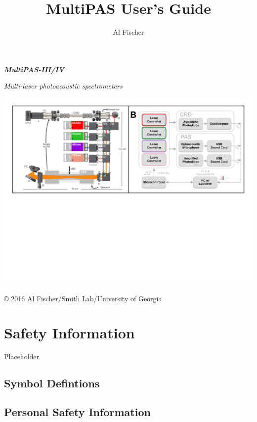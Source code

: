 \documentclass[]{book}
\title{MultiPAS User's Guide}
\author{Al Fischer}
\date{}
\begin{document}
\maketitle

\chapter*{}\label{section}

\textbf{\emph{MultiPAS-III/IV}}

\emph{Multi-laser photoacoustic spectrometers}

\begin{center}\includegraphics{./images/multiPAS} \end{center}

© 2016 Al Fischer/Smith Lab/University of Georgia

\chapter{Safety Information}\label{safety-information}

Placeholder

\section{Symbol Defintions}\label{symbol-defintions}

\section{Personal Safety Information}\label{personal-safety-information}
\end{document}
